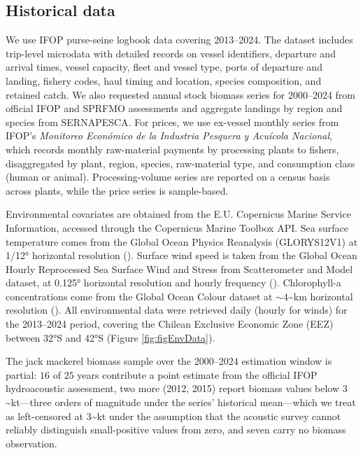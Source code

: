 \documentclass[
  11pt,
]{article}
\begin{document}
\subsection{Historical data}\label{historical-data}

We use IFOP purse-seine logbook data covering 2013--2024. The dataset includes trip-level microdata with detailed records on vessel identifiers, departure and arrival times, vessel capacity, fleet and vessel type, ports of departure and landing, fishery codes, haul timing and location, species composition, and retained catch. We also requested annual stock biomass series for 2000--2024 from official IFOP and SPRFMO assessments and aggregate landings by region and species from SERNAPESCA. For prices, we use ex-vessel monthly series from IFOP's \emph{Monitoreo Económico de la Industria Pesquera y Acuícola Nacional}, which records monthly raw-material payments by processing plants to fishers, disaggregated by plant, region, species, raw-material type, and consumption class (human or animal). Processing-volume series are reported on a census basis across plants, while the price series is sample-based.

Environmental covariates are obtained from the E.U. Copernicus Marine Service Information, accessed through the Copernicus Marine Toolbox API. Sea surface temperature comes from the Global Ocean Physics Reanalysis (GLORYS12V1) at 1/12° horizontal resolution (). Surface wind speed is taken from the Global Ocean Hourly Reprocessed Sea Surface Wind and Stress from Scatterometer and Model dataset, at 0.125° horizontal resolution and hourly frequency (). Chlorophyll-a concentrations come from the Global Ocean Colour dataset at \(\sim 4\)\textasciitilde km horizontal resolution (). All environmental data were retrieved daily (hourly for winds) for the 2013--2024 period, covering the Chilean Exclusive Economic Zone (EEZ) between 32°S and 42°S (Figure \ref{fig:figEnvData}).

The jack mackerel biomass sample over the 2000--2024 estimation window is partial: \(16\) of \(25\) years contribute a point estimate from the official IFOP hydroacoustic assessment, two more (2012, 2015) report biomass values below \(3\)\textasciitilde kt---three orders of magnitude under the series' historical mean---which we treat as left-censored at \(3\)\textasciitilde kt under the assumption that the acoustic survey cannot reliably distinguish small-positive values from zero, and seven carry no biomass observation.
\end{document}
